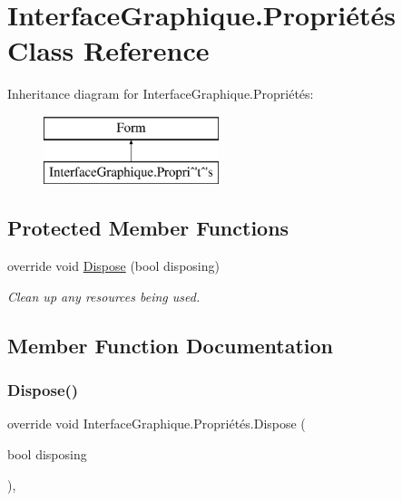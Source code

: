 \hypertarget{class_interface_graphique_1_1_propri_xC3_xA9t_xC3_xA9s}{}\section{Interface\+Graphique.\+Propriétés Class Reference}
\label{class_interface_graphique_1_1_propri_xC3_xA9t_xC3_xA9s}
Inheritance diagram for Interface\+Graphique.\+Propriétés\+:\begin{figure}[H]
\begin{center}
\leavevmode
\includegraphics[height=2.000000cm]{class_interface_graphique_1_1_propri_xC3_xA9t_xC3_xA9s}
\end{center}
\end{figure}
\subsection*{Protected Member Functions}
\begin{DoxyCompactItemize}
\item 
override void \hyperlink{class_interface_graphique_1_1_propri_xC3_xA9t_xC3_xA9s_a3d9a2d4aa0c5ff07def08a4867803ada}{Dispose} (bool disposing)
\begin{DoxyCompactList}\small\item\em Clean up any resources being used. \end{DoxyCompactList}\end{DoxyCompactItemize}


\subsection{Member Function Documentation}
\hypertarget{class_interface_graphique_1_1_propri_xC3_xA9t_xC3_xA9s_a3d9a2d4aa0c5ff07def08a4867803ada}{}\label{class_interface_graphique_1_1_propri_xC3_xA9t_xC3_xA9s_a3d9a2d4aa0c5ff07def08a4867803ada} 
\subsubsection{\texorpdfstring{Dispose()}{Dispose()}}
{\footnotesize\ttfamily override void Interface\+Graphique.\+Propriétés.\+Dispose (\begin{DoxyParamCaption}\item[{bool}]{disposing }\end{DoxyParamCaption})\hspace{0.3cm}{\ttfamily [inline]}, {\ttfamily [protected]}}



